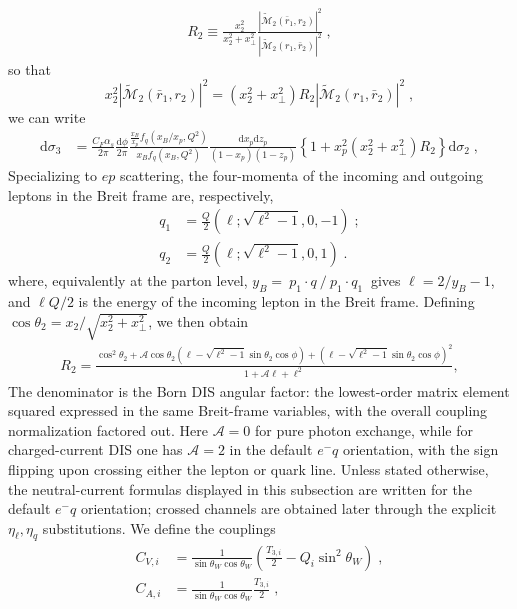 \documentclass[a4paper,11pt]{article}
\newcommand{\ldot}[2]  {\:{#1}\!\cdot\!{#2}\:}
\begin{document}
\begin{align}\label{eq:R2}
R_2 \equiv \frac{x_2^2}{x^2_2+x^2_\perp} \frac{|\widetilde{\mathcal{M}}_2(\bar{r}_1,r_2)|^2}{|\widetilde{\mathcal{M}}_2(r_1,\bar{r}_2)|^2}\;,
\end{align}
so that
\begin{equation}
  x_2^2 |\widetilde{\mathcal{M}}_2(\bar{r}_1,r_2)|^2
  = (x_2^2+x_\perp^2) R_2 |\widetilde{\mathcal{M}}_2(r_1,\bar{r}_2)|^2\;,
\end{equation}
we can write
\begin{align}
  \mathrm{d}\sigma_3 &= \frac{C_F\alpha_s}{2\pi}\frac{\mathrm{d}\phi}{2\pi}
    \frac{\frac{x_B}{x_p} f_q(x_B/x_p,Q^2)}
         { x_B    f_q( x_B    ,Q^2)}
    \frac{\mathrm{d} x_p \mathrm{d}z_p}{(1-x_p)(1-z_p)} \left\{ 1 +
         x_p^2 (x_2^2 + x_\perp^2) R_2 \right\} \mathrm{d} \sigma_2\;,
\label{eq:QCDC3}
\end{align}
Specializing to $ep$ scattering, the four-momenta of the incoming and outgoing leptons in the Breit frame are, respectively,
\begin{align}
q_1 &= \frac{Q}2(\ell;\sqrt{\ell^2-1},0,-1)\;;\\
q_2 &= \frac{Q}2(\ell;\sqrt{\ell^2-1},0,1)\;.
\end{align}
where, equivalently at the parton level, $y_B=\ldot{p_1}{q}/\ldot{p_1}{q_1}$ gives $\ell = 2/y_B -1$, and $\ell Q/2$ is the energy of the incoming lepton in the Breit frame. Defining $\cos\theta_2 = x_2 / \sqrt{x_2^2 + x_\perp^2}$, we then obtain
\begin{align}\label{eq:R2expression}
R_2 = \frac{\cos^2\theta_2+\mathcal{A}\cos\theta_2\left(\ell-\sqrt{\ell^2-1}\sin\theta_2\cos\phi\right)+\left(\ell-\sqrt{\ell^2-1}\sin\theta_2\cos\phi\right)^2}{1+\mathcal{A}\ell+\ell^2},
\end{align}
The denominator is the Born DIS angular factor: the lowest-order
matrix element squared expressed in the same Breit-frame variables,
with the overall coupling normalization factored out. Here
$\mathcal{A}=0$ for pure photon exchange, while for charged-current
DIS one has $\mathcal{A}=2$ in the default $e^-q$ orientation, with
the sign flipping upon crossing either the lepton or quark
line. Unless stated otherwise, the neutral-current formulas displayed
in this subsection are written for the default $e^-q$ orientation;
crossed channels are obtained later through the explicit
$\eta_\ell,\eta_q$ substitutions. We define the couplings
\begin{align}
C_{V,i} &= \frac{1}{\sin\theta_W \cos\theta_W} \left(\frac{T_{3,i}}{2} - Q_i \sin^2 \theta_W\right)\;,\\
C_{A,i} &= \frac{1}{\sin\theta_W \cos\theta_W} \frac{T_{3,i}}{2}\;,
\end{align}
\end{document}
